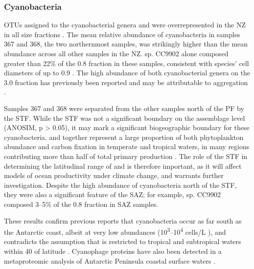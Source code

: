 \subsubsection{Cyanobacteria}

\acp{OTU} assigned to the cyanobacterial genera  and  were overrepresented in the \ac{NZ} in all size fractions .
The mean relative abundance of cyanobacteria in samples 367 and 368, the two northernmost samples, was strikingly higher than the mean abundance across all other samples in the \ac{NZ}.
 sp. CC9902 alone composed greater than 22\% of the 0.8 \micron{} fraction in these samples, consistent with  species' cell diameters of up to 0.9 \micron \cite{Waterbury:1985js}.
The high abundance of both cyanobacterial genera on the 3.0 \micron{} fraction has previously been reported \cite{Lauro:2010jna} and may be attributable to aggregation \cite{Lomas:2011bp}.

Samples 367 and 368 were separated from the other samples north of the \ac{PF} by the \ac{STF}.
While the \ac{STF} was not a significant boundary on the assemblage level (ANOSIM, p > 0.05), it may mark a significant biogeographic boundary for these cyanobacteria.
 and  together represent a large proportion of both phytoplankton abundance and carbon fixation in temperate and tropical waters, in many regions contributing more than half of total primary production \cite{Liu:1997ub,Liu:1998tk,Andre:1999uh}.
The role of the \ac{STF} in determining the latitudinal range of  and  is therefore important, as it will affect models of ocean productivity under climate change, and warrants further investigation.
Despite the high abundance of cyanobacteria north of the \ac{STF}, they were also a significant feature of the \ac{SAZ}; for example,  sp. CC9902 composed 3--5\% of the 0.8 \micron{} fraction in \ac{SAZ} samples.

These results confirm previous reports \cite{Marchant:1987wv,Ghiglione:2011ee} that cyanobacteria occur as far south as the Antarctic coast, albeit at very low abundances (10\textsuperscript{3}--10\textsuperscript{4} cells/L \cite{Marchant:1987wv}), and contradicts the assumption that  is restricted to tropical and subtropical waters within 40\textdegree{} of latitude \cite{Partensky:1999uf}.
Cyanophage proteins have also been detected in a metaproteomic analysis of Antarctic Peninsula coastal surface waters \cite{Williams:2012bs}.

